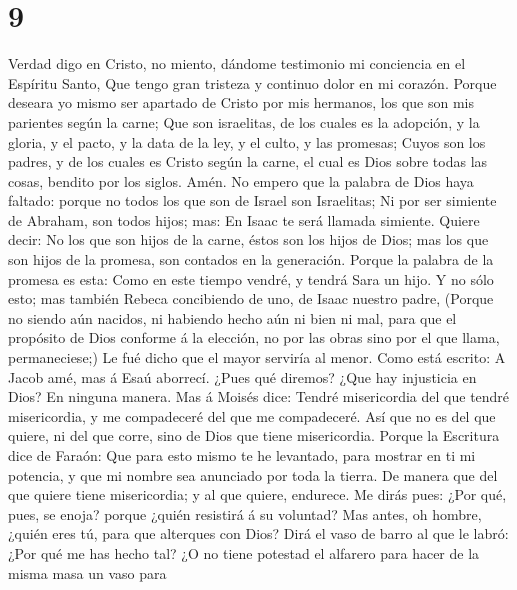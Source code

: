 \hypertarget{section-8}{%
\section{9}\label{section-8}}

 Verdad digo en Cristo, no miento, dándome testimonio mi
conciencia en el Espíritu Santo,  Que tengo gran tristeza y
continuo dolor en mi corazón.  Porque deseara yo mismo ser
apartado de Cristo por mis hermanos, los que son mis parientes según la
carne;  Que son israelitas, de los cuales es la adopción, y
la gloria, y el pacto, y la data de la ley, y el culto, y las promesas;
 Cuyos son los padres, y de los cuales es Cristo según la
carne, el cual es Dios sobre todas las cosas, bendito por los siglos.
Amén.  No empero que la palabra de Dios haya faltado: porque
no todos los que son de Israel son Israelitas;  Ni por ser
simiente de Abraham, son todos hijos; mas: En Isaac te será llamada
simiente.  Quiere decir: No los que son hijos de la carne,
éstos son los hijos de Dios; mas los que son hijos de la promesa, son
contados en la generación.  Porque la palabra de la promesa
es esta: Como en este tiempo vendré, y tendrá Sara un hijo.
 Y no sólo esto; mas también Rebeca concibiendo de uno, de
Isaac nuestro padre,  (Porque no siendo aún nacidos, ni
habiendo hecho aún ni bien ni mal, para que el propósito de Dios
conforme á la elección, no por las obras sino por el que llama,
permaneciese;)  Le fué dicho que el mayor serviría al
menor.  Como está escrito: A Jacob amé, mas á Esaú
aborrecí.  ¿Pues qué diremos? ¿Que hay injusticia en Dios?
En ninguna manera.  Mas á Moisés dice: Tendré misericordia
del que tendré misericordia, y me compadeceré del que me compadeceré.
 Así que no es del que quiere, ni del que corre, sino de
Dios que tiene misericordia.  Porque la Escritura dice de
Faraón: Que para esto mismo te he levantado, para mostrar en ti mi
potencia, y que mi nombre sea anunciado por toda la tierra.
 De manera que del que quiere tiene misericordia; y al que
quiere, endurece.  Me dirás pues: ¿Por qué, pues, se enoja?
porque ¿quién resistirá á su voluntad?  Mas antes, oh
hombre, ¿quién eres tú, para que alterques con Dios? Dirá el vaso de
barro al que le labró: ¿Por qué me has hecho tal?  ¿O no
tiene potestad el alfarero para hacer de la misma masa un vaso para
